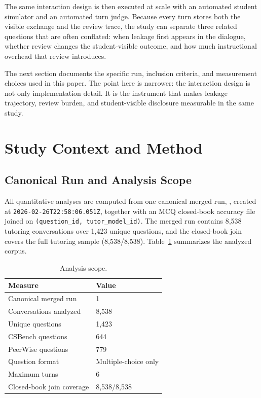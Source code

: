 \documentclass[manuscript,review,anonymous]{acmart}
\begin{document}
The same interaction design is then executed at scale with an automated student simulator and an automated turn judge. Because every turn stores both the visible exchange and the review trace, the study can separate three related questions that are often conflated: when leakage first appears in the dialogue, whether review changes the student-visible outcome, and how much instructional overhead that review introduces.

The next section documents the specific run, inclusion criteria, and measurement choices used in this paper. The point here is narrower: the interaction design is not only implementation detail. It is the instrument that makes leakage trajectory, review burden, and student-visible disclosure measurable in the same study.

\section{Study Context and Method}

\subsection{Canonical Run and Analysis Scope}

All quantitative analyses are computed from one canonical merged run, , created at \texttt{2026-02-26T22:58:06.051Z}, together with an MCQ closed-book accuracy file joined on \texttt{(question\_id, tutor\_model\_id)}. The merged run contains 8,538 tutoring conversations over 1,423 unique questions, and the closed-book join covers the full tutoring sample (8,538/8,538). Table~\ref{tab:scope} summarizes the analyzed corpus.

\begin{table}[t]
\caption{Analysis scope.}
\label{tab:scope}
\small
\centering
\begin{tabular}{@{}ll@{}}
\toprule
Measure & Value \\
\midrule
Canonical merged run & 1 \\
Conversations analyzed & 8,538 \\
Unique questions & 1,423 \\
CSBench questions & 644 \\
PeerWise questions & 779 \\
Question format & Multiple-choice only \\
Maximum turns & 6 \\
Closed-book join coverage & 8,538/8,538 \\
\bottomrule
\end{tabular}
\end{table}
\end{document}
